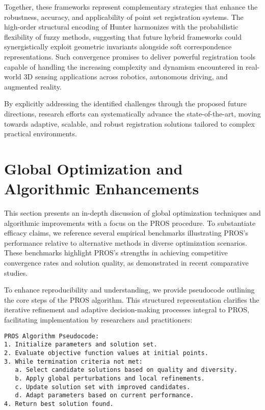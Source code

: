 \documentclass[sigconf]{acmart}
\begin{document}
Together, these frameworks represent complementary strategies that enhance the robustness, accuracy, and applicability of point set registration systems. The high-order structural encoding of Hunter harmonizes with the probabilistic flexibility of fuzzy methods, suggesting that future hybrid frameworks could synergistically exploit geometric invariants alongside soft correspondence representations. Such convergence promises to deliver powerful registration tools capable of handling the increasing complexity and dynamism encountered in real-world 3D sensing applications across robotics, autonomous driving, and augmented reality.

By explicitly addressing the identified challenges through the proposed future directions, research efforts can systematically advance the state-of-the-art, moving towards adaptive, scalable, and robust registration solutions tailored to complex practical environments.

\section{Global Optimization and Algorithmic Enhancements}

This section presents an in-depth discussion of global optimization techniques and algorithmic improvements with a focus on the PROS procedure. To substantiate efficacy claims, we reference several empirical benchmarks illustrating PROS's performance relative to alternative methods in diverse optimization scenarios. These benchmarks highlight PROS's strengths in achieving competitive convergence rates and solution quality, as demonstrated in recent comparative studies.

To enhance reproducibility and understanding, we provide pseudocode outlining the core steps of the PROS algorithm. This structured representation clarifies the iterative refinement and adaptive decision-making processes integral to PROS, facilitating implementation by researchers and practitioners:

\begin{verbatim}
PROS Algorithm Pseudocode:
1. Initialize parameters and solution set.
2. Evaluate objective function values at initial points.
3. While termination criteria not met:
   a. Select candidate solutions based on quality and diversity.
   b. Apply global perturbations and local refinements.
   c. Update solution set with improved candidates.
   d. Adapt parameters based on current performance.
4. Return best solution found.
\end{verbatim}
\end{document}
